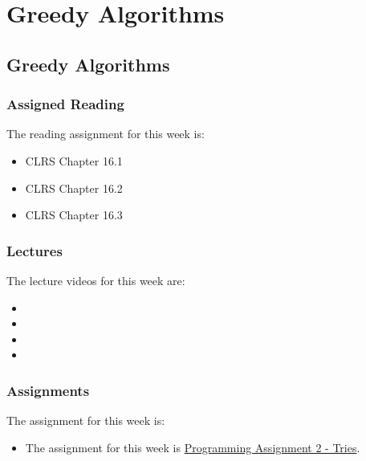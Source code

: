 \clearpage

\renewcommand{\ChapTitle}{Greedy Algorithms}
\renewcommand{\SectionTitle}{Greedy Algorithms}

\chapter{\ChapTitle}
\section{\SectionTitle}

\subsection{Assigned Reading}

The reading assignment for this week is:

\begin{itemize}
    \item CLRS Chapter 16.1
    \item CLRS Chapter 16.2
    \item CLRS Chapter 16.3
\end{itemize}

\subsection{Lectures}

The lecture videos for this week are:

\begin{itemize}
    \item {}
    \item {}
    \item {}
    \item {}
\end{itemize}

\subsection{Assignments}

The assignment for this week is:

\begin{itemize}
    \item The assignment for this week is \href{https://github.com/QuantumCompiler/CU/tree/main/CSPB%203104%20-%20Algorithms/CSPB%203104%20-%20Assignments/CSPB%203104%20-%20Programming%20Assignments/CSPB%203104%20-%20Programming%20Assignment%202%20-%20Tries}{Programming Assignment 2 - Tries}. 
\end{itemize}

